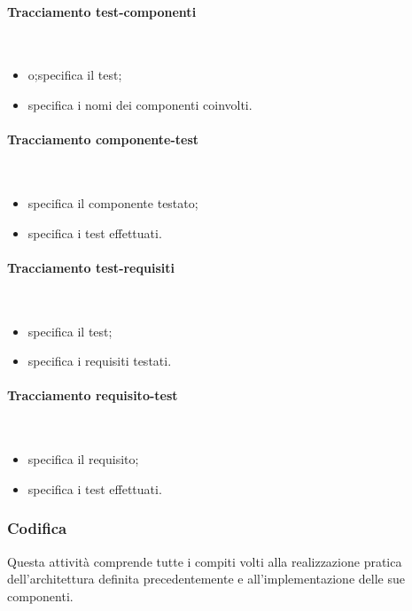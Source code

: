 \paragraph{Tracciamento test-componenti} \hfill \\
\begin{itemize}
\item {}o;specifica il test;
\item {}specifica i nomi dei componenti coinvolti.
\end{itemize}
\paragraph{Tracciamento componente-test} \hfill \\
\begin{itemize}
\item {}specifica il componente testato;
\item {}specifica i test effettuati.
\end{itemize}
\paragraph{Tracciamento test-requisiti} \hfill \\
\begin{itemize}
\item {}specifica il test;
\item {}specifica i requisiti testati.
\end{itemize}
\paragraph{Tracciamento requisito-test} \hfill \\
\begin{itemize}
\item {}specifica il requisito;
\item {}specifica i test effettuati.
\end{itemize}





\subsubsection{Codifica}
Questa attivit\`{a} comprende tutte i compiti volti alla realizzazione pratica dell'architettura definita precedentemente e all'implementazione delle sue componenti.

